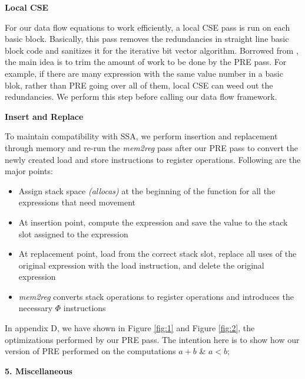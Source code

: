 \documentclass[10pt,twoside]{report}
\begin{document}
\begin{flushleft}
\textbf{\large{Local CSE}}
\end{flushleft}
For our data flow equations to work efficiently, a local CSE pass is run
on each basic block. Basically, this pass removes the redundancies in
straight line basic block code and sanitizes it for the iterative bit vector
algorithm. Borrowed from \cite{Knoop:1994:OCM:183432.183443}, the main idea
is to trim the amount of work to be done by the PRE pass. For example, if there are many
expression with the same value number in a basic blok, rather than PRE going over all of them, 
local CSE can weed out the redundancies. We perform this step before calling
our data flow framework. 

\begin{flushleft}
\textbf{\large{Insert and Replace}}
\end{flushleft}
To maintain compatibility with SSA, we perform insertion and replacement
  through memory and re-run the \emph{mem2reg} pass after our PRE pass to convert the
  newly created load and store instructions to register operations. Following
  are the major points:
\begin{itemize}  
  \item Assign stack space \emph{(allocas)} at the beginning of the
  function for all the expressions that need movement
  \item At insertion point,
           compute the expression and save the value to the stack slot assigned to the
             expression 
  \item At replacement point, load from the correct stack
             slot, replace all uses of the original expression with the load
             instruction, and delete the original expression
  \item \emph{mem2reg} converts stack operations to register operations and introduces the 
             necessary ${\Phi}$ instructions
\end{itemize}  

In appendix D, we have shown in Figure \ref{fig:1}
and Figure \ref{fig:2}, the optimizations performed by our PRE pass. The intention here is to
  show how our version of PRE performed on the computations $a + b$ \& $a < b$;

\begin{flushleft}
\textbf{\Large{5. Miscellaneous}}
\end{flushleft}
\end{document}
